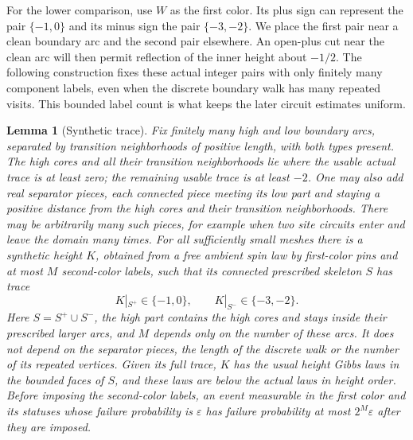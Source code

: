 \documentclass[11pt]{article}
\newtheorem{lemma}[theorem]{Lemma}
\theoremstyle{definition}
\theoremstyle{remark}
\numberwithin{equation}{section}
\begin{document}
For the lower comparison, use $W$ as the first color.  Its plus sign
can represent the pair $\{-1,0\}$ and its minus sign the pair
$\{-3,-2\}$.  We place the first pair near a clean boundary arc and
the second pair elsewhere.  An open-plus cut near the clean arc will
then permit reflection of the inner height about $-1/2$.  The following
construction fixes these actual integer pairs with only finitely many
component labels, even when the discrete boundary walk has many repeated
visits.  This bounded label count is what keeps the later circuit
estimates uniform.

\begin{lemma}[Synthetic trace]\label{boundary:synthetic-trace}
Fix finitely many high and low boundary arcs, separated by transition
neighborhoods of positive length, with both types present.  The high
cores and all their transition neighborhoods lie where the usable actual
trace is at least zero; the remaining usable trace is at least $-2$.
One may also add real separator pieces, each connected piece meeting
its low part and staying a positive distance from the high cores and
their transition neighborhoods.  There may be arbitrarily many such
pieces, for example when two site circuits enter and leave the domain
many times.  For all sufficiently small meshes there is a synthetic
height $K$, obtained from a free
ambient spin law by first-color pins and at most $M$ second-color
labels, such that its connected prescribed skeleton $S$ has trace
\begin{equation}
 K|_{S^+}\in\{-1,0\},\qquad
 K|_{S^-}\in\{-3,-2\}.
 \label{boundary:synthetic-pairs}
\end{equation}
Here $S=S^+\cup S^-$, the high part contains the high cores and stays
inside their prescribed larger arcs, and $M$ depends only on the
number of these arcs.  It does not depend on the separator pieces, the
length of the discrete walk or the number of its repeated vertices.
Given its full trace, $K$ has the usual height Gibbs laws in the
bounded faces of $S$, and these laws are below the actual laws in
height order.  Before imposing the second-color labels, an event
measurable in the first color and its statuses whose failure
probability is $\varepsilon$ has failure probability at most
$2^M\varepsilon$ after they are imposed.
\end{lemma}
\end{document}
